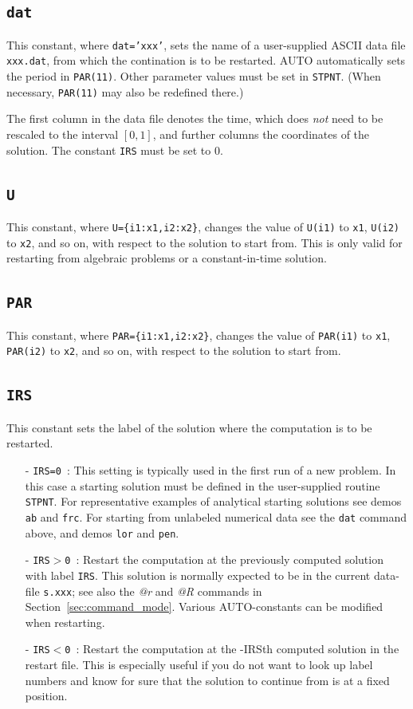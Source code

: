 \documentclass[12pt]{report}
\begin{document}
\subsection{\tt dat}  \label{sec:dat}
This constant, where {\tt dat='xxx'}, sets the name of a user-supplied ASCII
data file {\tt xxx.dat}, from which the contination is to be restarted.
{\cal AUTO} automatically sets the period in {\tt PAR(11)}.
Other parameter values must be set in {\tt STPNT}. (When necessary,
{\tt PAR(11)} may also be redefined there.) 

The first column in the data file denotes the time, which does
\emph{not} need to be rescaled to the interval $[0,1]$, and further
columns the coordinates of the solution. The constant {\tt IRS} must
be set to 0.

\subsection{\tt U}  \label{sec:U}
This constant, where {\tt U=\{i1:x1,i2:x2\}}, changes the value of
{\tt U(i1)} to {\tt x1}, {\tt U(i2)} to {\tt x2}, and so on,
with respect to the solution to start from. This is only
valid for restarting from algebraic problems or a constant-in-time
solution.

\subsection{\tt PAR}  \label{sec:PAR}
This constant, where {\tt PAR=\{i1:x1,i2:x2\}}, changes the value of
{\tt PAR(i1)}  to {\tt x1}, {\tt PAR(i2)} to
{\tt x2}, and so on, with respect to the solution to start from.

\subsection{\tt IRS}  \label{sec:IRS}
This constant sets the label of the solution where the computation
is to be restarted.
\begin{itemize}
\item[-] {\tt IRS=0}~:  
  This setting is typically used in the first run of a new problem.
  In this case a starting solution must be defined in the user-supplied
  routine {\tt STPNT}.
  For representative examples of analytical starting solutions 
  see demos {\tt ab} and {\tt frc}.
  For starting from unlabeled numerical data see the {\tt dat} command
  above, and demos {\tt lor} and {\tt pen}.
  
\item[-] {\tt IRS$>$0}~: 
  Restart the computation at the previously computed solution with label {\tt IRS}. 
  This solution is normally expected to be in the current data-file 
 {\tt s.xxx}; see also the {\it @r} and {\it @R} commands in 
 Section~\ref{sec:command_mode}.
 Various {\cal AUTO}-constants can be modified when restarting.

\item[-] {\tt IRS$<$0}~:
  Restart the computation at the -IRSth computed solution in the
  restart file. This is especially useful if you do not want to look
  up label numbers and know for sure that the solution to continue
  from is at a fixed position.
\end{itemize}
\end{document}
